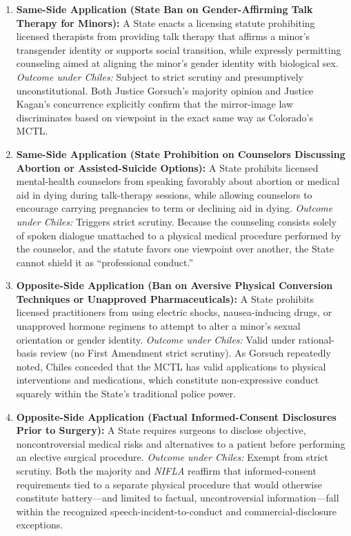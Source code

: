 \documentclass[12pt]{article}
\begin{document}
\begin{enumerate}
  \item \textbf{Same-Side Application (State Ban on Gender-Affirming Talk Therapy for Minors):} A State enacts a licensing statute prohibiting licensed therapists from providing talk therapy that affirms a minor's transgender identity or supports social transition, while expressly permitting counseling aimed at aligning the minor's gender identity with biological sex. \textit{Outcome under Chiles:} Subject to strict scrutiny and presumptively unconstitutional. Both Justice Gorsuch's majority opinion and Justice Kagan's concurrence explicitly confirm that the mirror-image law discriminates based on viewpoint in the exact same way as Colorado's MCTL.

  \item \textbf{Same-Side Application (State Prohibition on Counselors Discussing Abortion or Assisted-Suicide Options):} A State prohibits licensed mental-health counselors from speaking favorably about abortion or medical aid in dying during talk-therapy sessions, while allowing counselors to encourage carrying pregnancies to term or declining aid in dying. \textit{Outcome under Chiles:} Triggers strict scrutiny. Because the counseling consists solely of spoken dialogue unattached to a physical medical procedure performed by the counselor, and the statute favors one viewpoint over another, the State cannot shield it as ``professional conduct.''

  \item \textbf{Opposite-Side Application (Ban on Aversive Physical Conversion Techniques or Unapproved Pharmaceuticals):} A State prohibits licensed practitioners from using electric shocks, nausea-inducing drugs, or unapproved hormone regimens to attempt to alter a minor's sexual orientation or gender identity. \textit{Outcome under Chiles:} Valid under rational-basis review (no First Amendment strict scrutiny). As Gorsuch repeatedly noted, Chiles conceded that the MCTL has valid applications to physical interventions and medications, which constitute non-expressive conduct squarely within the State's traditional police power.

  \item \textbf{Opposite-Side Application (Factual Informed-Consent Disclosures Prior to Surgery):} A State requires surgeons to disclose objective, noncontroversial medical risks and alternatives to a patient before performing an elective surgical procedure. \textit{Outcome under Chiles:} Exempt from strict scrutiny. Both the majority and \textit{NIFLA} reaffirm that informed-consent requirements tied to a separate physical procedure that would otherwise constitute battery---and limited to factual, uncontroversial information---fall within the recognized speech-incident-to-conduct and commercial-disclosure exceptions.


\end{enumerate}
\end{document}
